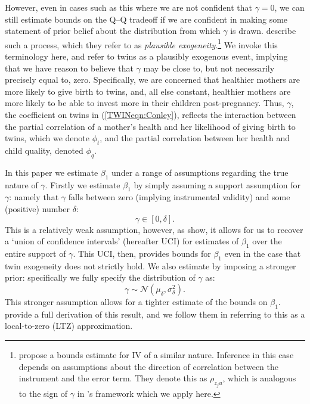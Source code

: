 However, even in cases such as this where we are not confident that $\gamma=0$,
we can still estimate bounds on the Q--Q tradeoff if we are confident in making
some statement of prior belief about the distribution from which $\gamma$ is 
drawn.  \citet{Conleyetal2012} describe such a process, which they refer to as 
\emph{plausible exogeneity}.\footnote{\citet{NevoRosen2012} propose a bounds
estimate for IV of a similar nature.  Inference in this case depends on 
assumptions about the direction of correlation between the instrument and the 
error term. They denote this as $\rho_{z_{j}u}$, which is analogous to the sign 
of $\gamma$ in \citeauthor{Conleyetal2012}'s framework which we apply here.} We 
invoke this terminology here, and refer to twins as a plausibly exogenous event, 
implying that we have reason to believe that $\gamma$ may be close to, but not 
necessarily precisely equal to, zero. Specifically, we are concerned that 
healthier mothers are more likely to give birth to twins, and, all else 
constant, healthier mothers are more likely to be able to invest more in their 
children post-pregnancy.  Thus, $\gamma$, the coefficient on twins in 
(\ref{TWINeqn:Conley}), reflects the interaction between the partial correlation 
of a mother's health and her likelihood of giving birth to twins, which we 
denote $\phi_t$, and the partial correlation between her health and child 
quality, denoted $\phi_q$.

In this paper we estimate $\beta_1$ under a range of assumptions regarding the
true nature of $\gamma$.  Firstly we estimate $\beta_1$ by simply assuming a
support assumption for $\gamma$: namely that $\gamma$ falls between zero 
(implying instrumental validity) and some (positive) number $\delta$:
\begin{equation}
\label{TWINeqn:uci}
\gamma \in [0,\delta].
\end{equation}
This is a relatively weak assumption, however, as \citet{Conleyetal2012} show,
it allows for us to recover a `union of confidence intervals' (hereafter UCI) 
for estimates of $\beta_1$ over the entire support of $\gamma$.  This UCI, then, 
provides bounds for $\beta_1$ even in the case that twin exogeneity does not 
strictly hold. We also estimate by imposing a stronger prior: specifically we 
fully specify the distribution of $\gamma$ as:
\begin{equation}
\label{TWINeqn:ltz}
\gamma \sim \mathcal{N}(\mu_\delta,\sigma^2_\delta).
\end{equation}
This stronger assumption allows for a tighter estimate of the bounds on 
$\beta_1$.  \citet{Conleyetal2012} provide a full derivation of this result, and 
we follow them in referring to this as a local-to-zero (LTZ) approximation.

